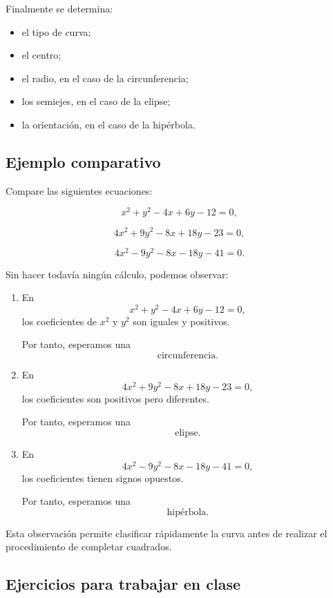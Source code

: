 \documentclass[12pt]{article}
\begin{document}
Finalmente se determina:

\begin{itemize}
    \item el tipo de curva;
    \item el centro;
    \item el radio, en el caso de la circunferencia;
    \item los semiejes, en el caso de la elipse;
    \item la orientación, en el caso de la hipérbola.
\end{itemize}

\subsection*{Ejemplo comparativo}

Compare las siguientes ecuaciones:

\[
x^2+y^2-4x+6y-12=0,
\]

\[
4x^2+9y^2-8x+18y-23=0,
\]

\[
4x^2-9y^2-8x-18y-41=0.
\]

Sin hacer todavía ningún cálculo, podemos observar:

\begin{enumerate}

\item En
\[
x^2+y^2-4x+6y-12=0,
\]
los coeficientes de \(x^2\) y \(y^2\) son iguales y positivos.

Por tanto, esperamos una
\[
\boxed{\text{circunferencia}.}
\]

\item En
\[
4x^2+9y^2-8x+18y-23=0,
\]
los coeficientes son positivos pero diferentes.

Por tanto, esperamos una
\[
\boxed{\text{elipse}.}
\]

\item En
\[
4x^2-9y^2-8x-18y-41=0,
\]
los coeficientes tienen signos opuestos.

Por tanto, esperamos una
\[
\boxed{\text{hipérbola}.}
\]

\end{enumerate}

Esta observación permite clasificar rápidamente la curva antes de
realizar el procedimiento de completar cuadrados.

\subsection*{Ejercicios para trabajar en clase}
\end{document}
